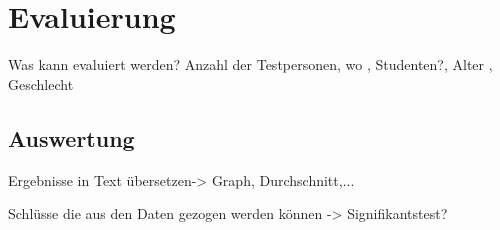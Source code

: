 \chapter{Evaluierung}%

\label{cha:Eval}

Was kann evaluiert werden?
\colorbox{red!30}{Anzahl der Testpersonen, wo , Studenten?, Alter , Geschlecht}


\section{Auswertung}
\colorbox{red!30}{Ergebnisse in Text übersetzen-> Graph, Durchschnitt,...}

\colorbox{red!30}{Schlüsse die aus den Daten gezogen werden können -> Signifikantstest?}





